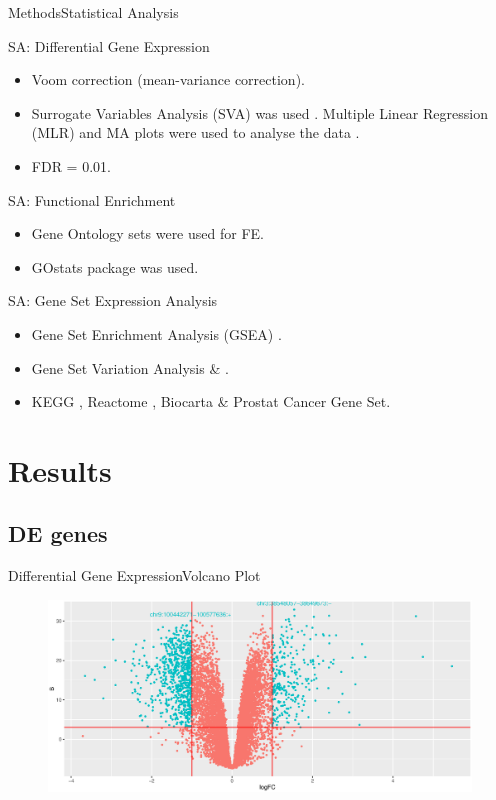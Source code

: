\documentclass{beamer}
\begin{document}
\begin{frame}{Methods}{Statistical Analysis}
	\begin{block}{SA: Differential Gene Expression}
		\begin{itemize}
			\item Voom correction (mean-variance correction).
			\item Surrogate Variables Analysis (SVA) was used \cite{leek2007capturing} \cite{svamanual}. Multiple Linear Regression (MLR)  and MA plots were used to analyse the data \cite{limma}.
			\item FDR = 0.01.
		\end{itemize}
	\end{block}
	\begin{block}{SA: Functional Enrichment}
		\begin{itemize}
			\item Gene Ontology sets were used for FE.
			\item GOstats package \cite{GOstats} was used.
		\end{itemize}
	\end{block}
	\begin{block}{SA: Gene Set Expression Analysis}
		\begin{itemize}
			\item Gene Set Enrichment Analysis (GSEA) \cite{GSEABase}.
			\item Gene Set Variation Analysis \cite{GSVA} \& \cite{GSVAdata}.
			\item KEGG \cite{kanehisa2016kegg}, Reactome \cite{fabregat2016reactome}, Biocarta \cite{nishimura2001biocarta} \& Prostat Cancer Gene Set.
		\end{itemize}
	\end{block}	
\end{frame}


\section{Results}


\subsection{DE genes}

\begin{frame}{Differential Gene Expression}{Volcano Plot}

   \begin{figure}
        \includegraphics[width=1\textwidth]{Volcano.eps}
    \end{figure}

\end{frame}
\end{document}
